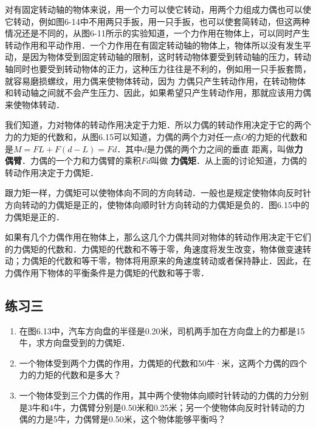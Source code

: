 对有固定转动轴的物体来说，用一个力可以使它转动，用两个力组成力偶也可以使它转动，例如图6-14中不用两只手扳，用一只手扳，也可以使套简转动，但这两种情况还是不同的，从图6-11所示的实验知道，一个力作用在物体上，可以同时产生转动作用和平动作用．一个力作用在有固定转动轴的物体上，物体所以没有发生平动，是因为物体受到固定转动轴的限制，这时转动物体要受到转动轴的压力，转动轴同时也要受到转动物体的正力，这种压力往往是不利的，例如用一只手扳套筒，就容易磨损螺纹，用力偶来使物体转动，因为
力偶只产生转动作用，在转动物体和转动轴之间就不会产生压力、因此，如果希望只产生转动作用，那就应该用力偶来使物体转动．
\begin{figure}[htp]
\centering
{}
\caption{}
\end{figure}

我们知道，力对物体的转动作用决定于力矩．所以力偶的转动作用决定于它的两个力的力矩的代数和，从图6.15可以知道，力偶的两个力对任一点$O$的力矩的代数和是$M=FL+F(d-L)=Fd$．其中$d$是力偶的两个力之间的垂直
距离，叫做\textbf{力偶臂}．力偶的一个力和力偶臂的乘积$Fd$叫做
\textbf{力偶矩}．从上面的讨论知道，力偶的转动作用决定于力偶矩．

跟力矩一样，力偶矩可以使物体向不同的方向转动．一般也是规定使物体向反时针方向转动的力偶矩是正的，使物体向顺时针方向转动的力偶矩是负的．图6.15中的力偶矩是正的．




如果有几个力偶作用在物体上，那么这几个力偶共同对物体的转动作用决定干它们的力偶矩的代数和．力偶矩的代数和不等于零，角速度将发生改变，物体做变速转动；力偶矩的代数和等干零，物体将用原来的角速度转动或者保持静止．因此，在力偶作用下物体的平衡条件是力偶矩的代数和等于零．

\subsection*{练习三}
\begin{enumerate}
    \item 在图6.13中，汽车方向盘的半径是0.20米，司机两手加在方向盘上的力都是15牛，求方向盘受到的力偶矩．
    \item 一个物体受到两个力偶的作用，力偶矩的代数和50牛·米，这两个力偶的四个力的力矩的代数和是多大？
    \item 一个物体受到三个力偶的作用，其中两个使物体向顺时针转动的力偶的力分别是3牛和4牛，力偶臂分别是0.50米和0.25米；另一个使物体向反时针转动的力偶的力是5牛，力偶臂是0.50米，这个物体能够平衡吗？
\end{enumerate}


